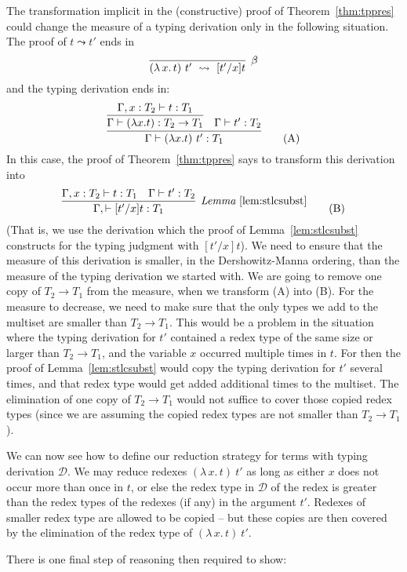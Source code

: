 \documentclass{article}
\providecommand{\betarule}[0]{\infer[\beta]{(\lambda\,x.\, t)\ t'\ \leadsto\ [t'/x]t}
                                {\ }}
\begin{document}
The transformation implicit in the (constructive) proof of Theorem~\ref{thm:tppres}
could change the measure of a typing derivation only in the following situation.  The
proof of $t \leadsto t'$ ends in
\[
\betarule
\]
\noindent and the typing derivation ends in:
\begin{equation}
\infer{\Gamma \vdash (\lambda x.t)\ t' : T_1}
       {\infer{\Gamma \vdash (\lambda x.t) : T_2\to T_1}
              {\Gamma, x : T_2 \vdash t : T_1} & \Gamma \vdash t' : T_2}
\tag{A}
\end{equation}
\noindent In this case, the proof of Theorem~\ref{thm:tppres} says
to transform this derivation into
\begin{equation}
\infer[\textit{Lemma}~\ref{lem:stlcsubst}]
      {\Gamma,\vdash [t'/x]t:T_1}
      {\Gamma, x : T_2 \vdash t : T_1 & \Gamma \vdash t' : T_2}
\tag{B}
\end{equation}
\noindent (That is, we use the derivation which the proof of Lemma~\ref{lem:stlcsubst} constructs
for the typing judgment with $[t'/x]t$).  We need to ensure that the measure of this derivation is smaller,
in the Dershowitz-Manna ordering, than the measure of the typing derivation
we started with.  We are going to remove one copy of $T_2 \to T_1$ from
the measure, when we transform (A) into (B).  For the measure to decrease,
we need to make sure that the only types we add to the multiset are smaller than $T_2 \to T_1$.
This would be a problem in the situation where the typing derivation for $t'$ contained a redex
type of the same size or larger than $T_2 \to T_1$, and the variable $x$ occurred multiple times in $t$.  For then
the proof of Lemma~\ref{lem:stlcsubst} would copy the typing derivation for $t'$
several times, and that redex type would get added additional times to the multiset.  The elimination
of one copy of $T_2 \to T_1$ would not suffice to cover those copied redex types (since we are assuming
the copied redex types are not smaller than $T_2 \to T_1$).

We can now see how to define our reduction strategy for terms with
typing derivation $\mathcal{D}$.  We may reduce redexes
$(\lambda\,x.\,t)\ t'$ as long as either $x$ does not occur more than
once in $t$, or else the redex type in $\mathcal{D}$ of the redex is
greater than the redex types of the redexes (if any) in the argument
$t'$.  Redexes of smaller redex type are allowed to be copied -- but
these copies are then covered by the elimination of the redex type of
$(\lambda\,x.\,t)\ t'$.

There is one final step of reasoning then required to show:
\end{document}
